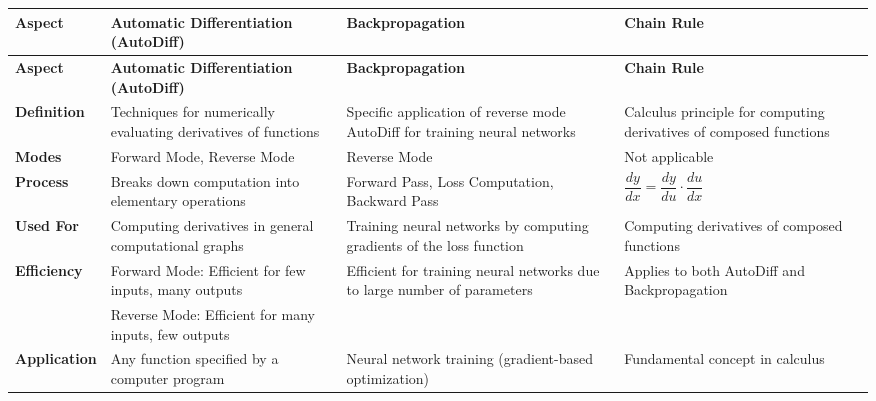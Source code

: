 \begin{longtable}{|p{2cm}|p{5cm}|p{3.5cm}|p{3.5cm}|}
    \hline
    \textbf{Aspect} & \textbf{Automatic Differentiation (AutoDiff)} & \textbf{Backpropagation} & \textbf{Chain Rule} \\
    \hline
    \endfirsthead
    
    \hline
    \textbf{Aspect} & \textbf{Automatic Differentiation (AutoDiff)} & \textbf{Backpropagation} & \textbf{Chain Rule} \\
    \hline\endhead
    
    \hline \endfoot
    
    \hline\endlastfoot
    
    \textbf{Definition} & Techniques for numerically evaluating derivatives of functions & Specific application of reverse mode AutoDiff for training neural networks & Calculus principle for computing derivatives of composed functions \\
    \hline

    \textbf{Modes} & Forward Mode, Reverse Mode & Reverse Mode & Not applicable \\
    \hline
    
    \textbf{Process} & Breaks down computation into elementary operations & Forward Pass, Loss Computation, Backward Pass & \(\dfrac{dy}{dx} = \dfrac{dy}{du} \cdot \dfrac{du}{dx}\) \\
    \hline
    
    \textbf{Used For} & Computing derivatives in general computational graphs & Training neural networks by computing gradients of the loss function & Computing derivatives of composed functions \\
    \hline
    
    \textbf{Efficiency} & Forward Mode: Efficient for few inputs, many outputs & Efficient for training neural networks due to large number of parameters & Applies to both AutoDiff and Backpropagation \\
    & Reverse Mode: Efficient for many inputs, few outputs & & \\
    \hline
    
    \textbf{Application} & Any function specified by a computer program & Neural network training (gradient-based optimization) & Fundamental concept in calculus \\
    \hline
    
\end{longtable}



